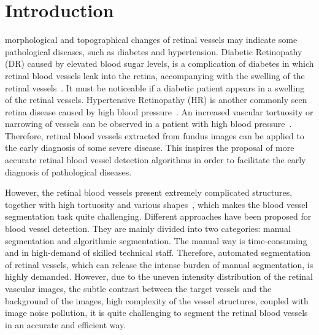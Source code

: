 \documentclass[journal]{IEEEtran}
\begin{document}
\section{Introduction}
\label{sec:intro}
 morphological and topographical changes of retinal vessels may indicate some pathological diseases, such as diabetes and hypertension. Diabetic Retinopathy (DR) caused by elevated blood sugar levels, is a complication of diabetes in which retinal blood vessels leak into the retina, accompanying with the swelling of the retinal vessels~\cite{Smart2015A}. It must be noticeable if a diabetic patient appears in a swelling of the retinal vessels. Hypertensive Retinopathy (HR) is another commonly seen retina disease caused by high blood pressure~\cite{irshad_classification_2015}. An increased vascular tortuosity or narrowing of vessels can be observed in a patient with high blood pressure~\cite{cheung_retinal_2011}. Therefore, retinal blood vessels extracted from fundus images can be applied to the early diagnosis of some severe disease. This inspires the proposal of more accurate retinal blood vessel detection algorithms in order to facilitate the early diagnosis of pathological diseases.

However, the retinal blood vessels present extremely complicated structures, together with high tortuosity and various shapes~\cite{han_blood_2015}, which makes the blood vessel segmentation task quite challenging. Different approaches have been proposed for blood vessel detection. They are mainly divided into two categories: manual segmentation and algorithmic segmentation. The manual way is time-consuming and in high-demand of skilled technical staff. Therefore, automated segmentation of retinal vessels, which can release the intense burden of manual segmentation, is highly demanded. However, due to the uneven intensity distribution of the retinal vascular images, the subtle contrast between the target vessels and the background of the images, high complexity of the vessel structures, coupled with image noise pollution, it is quite challenging to segment the retinal blood vessels in an accurate and efficient way.
\end{document}
